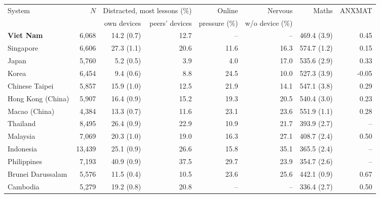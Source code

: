 \begin{tabular}{@{}lrrrrrrr@{}}
\toprule
System & $N$ & \multicolumn{2}{c}{Distracted, most lessons (\%)} & Online & Nervous & Maths & ANXMAT \\
 & & own devices & peers' devices & pressure (\%) & w/o device (\%) & &  \\
\midrule
\textbf{Viet Nam} & 6,068 & 14.2 (0.7) & 12.7 & -- & -- & 469.4 (3.9) & 0.45 \\
Singapore & 6,606 & 27.3 (1.1) & 20.6 & 11.6 & 16.3 & 574.7 (1.2) & 0.15 \\
Japan & 5,760 & 5.2 (0.5) & 3.9 & 4.0 & 17.0 & 535.6 (2.9) & 0.33 \\
Korea & 6,454 & 9.4 (0.6) & 8.8 & 24.5 & 10.0 & 527.3 (3.9) & -0.05 \\
Chinese Taipei & 5,857 & 15.9 (1.0) & 12.5 & 21.9 & 14.1 & 547.1 (3.8) & 0.29 \\
Hong Kong (China) & 5,907 & 16.4 (0.9) & 15.2 & 19.3 & 20.5 & 540.4 (3.0) & 0.23 \\
Macao (China) & 4,384 & 13.3 (0.7) & 11.6 & 23.1 & 23.6 & 551.9 (1.1) & 0.28 \\
Thailand & 8,495 & 26.4 (0.9) & 22.9 & 10.9 & 21.7 & 393.9 (2.7) & -- \\
Malaysia & 7,069 & 20.3 (1.0) & 19.0 & 16.3 & 27.1 & 408.7 (2.4) & 0.50 \\
Indonesia & 13,439 & 25.1 (0.9) & 26.6 & 15.8 & 35.1 & 365.5 (2.4) & -- \\
Philippines & 7,193 & 40.9 (0.9) & 37.5 & 29.7 & 23.9 & 354.7 (2.6) & -- \\
Brunei Darussalam & 5,576 & 11.5 (0.4) & 10.5 & 23.6 & 25.6 & 442.1 (0.9) & 0.67 \\
Cambodia & 5,279 & 19.2 (0.8) & 20.8 & -- & -- & 336.4 (2.7) & 0.50 \\
\bottomrule
\end{tabular}
